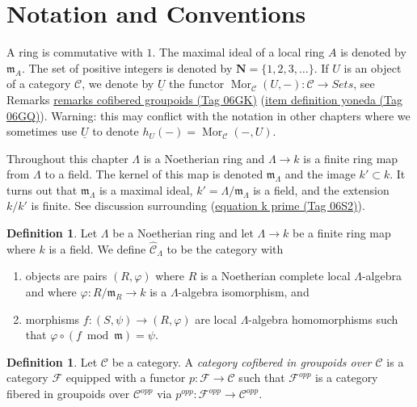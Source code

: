 \documentclass{amsart}
\theoremstyle{plain}
\theoremstyle{definition}
\newtheorem{definition}[subsection]{Definition}
\theoremstyle{remark}
\numberwithin{equation}{subsection}
\def\Mor{\mathop{\mathrm{Mor}}\nolimits}
\begin{document}
\section{Notation and Conventions}
\label{section-notations-conventions}

\noindent
A ring is commutative with $1$. The  maximal ideal of a local ring $A$
is denoted by $\mathfrak{m}_A$. The set of positive integers is denoted
by $\mathbf{N} = \{1, 2, 3, \ldots\}$. If $U$ is an object of a
category $\mathcal{C}$, we denote by $\underline{U}$
the functor
$\Mor_\mathcal{C}(U, -): \mathcal{C} \to \textit{Sets}$, see
Remarks \href{https://stacks.math.columbia.edu/tag/06GK}{remarks cofibered groupoids (Tag 06GK)} (\href{https://stacks.math.columbia.edu/tag/06GQ}{item definition yoneda (Tag 06GQ)}).
Warning: this may conflict with the notation in other chapters where we
sometimes use $\underline{U}$ to denote $h_U(-) = \Mor_\mathcal{C}(-, U)$.

\medskip\noindent
Throughout this chapter $\Lambda$ is a Noetherian ring and
$\Lambda \to k$ is a finite ring map from $\Lambda$ to a field.
The kernel of this map is denoted $\mathfrak m_\Lambda$ and the
image $k' \subset k$. It turns out that $\mathfrak m_\Lambda$ is
a maximal ideal, $k' = \Lambda/\mathfrak m_\Lambda$ is a field, and
the extension $k/k'$ is finite. See discussion surrounding
(\href{https://stacks.math.columbia.edu/tag/06S2}{equation k prime (Tag 06S2)}).




\begin{definition}
\label{definition-completion-CLambda}
Let $\Lambda$ be a Noetherian ring and let $\Lambda \to k$ be a finite
ring map where $k$ is a field. We define {\it $\widehat{\mathcal{C}}_\Lambda$}
to be the category with
\begin{enumerate}
\item objects are pairs $(R, \varphi)$ where $R$ is a Noetherian complete
local $\Lambda$-algebra and where $\varphi : R/\mathfrak m_R \to k$ is a
$\Lambda$-algebra isomorphism, and
\item morphisms $f : (S, \psi) \to (R, \varphi)$ are local $\Lambda$-algebra
homomorphisms such that $\varphi \circ (f \bmod \mathfrak m) = \psi$.
\end{enumerate}
\end{definition}

\begin{definition}
\label{definition-category-cofibred-groupoids}
Let $\mathcal{C}$ be a category.  A {\it category cofibered in groupoids over
$\mathcal{C}$} is a category $\mathcal{F}$ equipped with a functor
$p: \mathcal{F} \to \mathcal{C}$ such that $\mathcal{F}^{opp}$ is a category
fibered in groupoids over $\mathcal{C}^{opp}$ via
$p^{opp}: \mathcal{F}^{opp} \to \mathcal{C}^{opp}$.
\end{definition}
\end{document}
